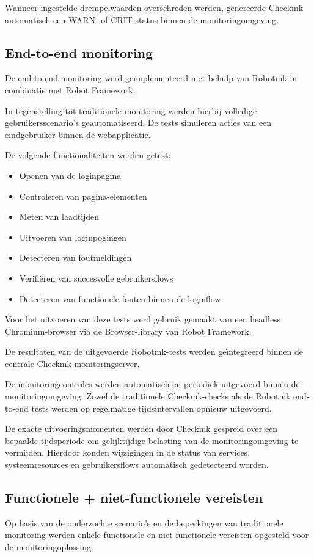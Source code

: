 Wanneer ingestelde drempelwaarden overschreden werden, genereerde Checkmk automatisch een WARN- of CRIT-status binnen de monitoringomgeving.

\subsection{End-to-end monitoring}

De end-to-end monitoring werd geïmplementeerd met behulp van Robotmk in combinatie met Robot Framework.

In tegenstelling tot traditionele monitoring werden hierbij volledige gebruikersscenario’s geautomatiseerd. De tests simuleren acties van een eindgebruiker binnen de webapplicatie.

De volgende functionaliteiten werden getest:

\begin{itemize}
    \item Openen van de loginpagina
    \item Controleren van pagina-elementen
    \item Meten van laadtijden
    \item Uitvoeren van loginpogingen
    \item Detecteren van foutmeldingen
    \item Verifiëren van succesvolle gebruikersflows
    \item Detecteren van functionele fouten binnen de loginflow
\end{itemize}

Voor het uitvoeren van deze tests werd gebruik gemaakt van een headless Chromium-browser via de Browser-library van Robot Framework.

De resultaten van de uitgevoerde Robotmk-tests werden geïntegreerd binnen de centrale Checkmk monitoringserver.

De monitoringcontroles werden automatisch en periodiek uitgevoerd binnen de monitoringomgeving. Zowel de traditionele Checkmk-checks als de Robotmk end-to-end tests werden op regelmatige tijdsintervallen opnieuw uitgevoerd.

De exacte uitvoeringsmomenten werden door Checkmk gespreid over een bepaalde tijdsperiode om gelijktijdige belasting van de monitoringomgeving te vermijden. Hierdoor konden wijzigingen in de status van services, systeemresources en gebruikersflows automatisch gedetecteerd worden.

\subsection{Functionele + niet-functionele vereisten}
Op basis van de onderzochte scenario’s en de beperkingen van traditionele monitoring werden enkele functionele en niet-functionele vereisten opgesteld voor de monitoringoplossing.

